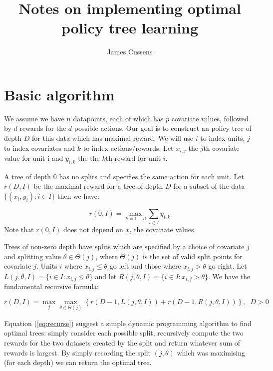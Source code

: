 \documentclass{article}
\title{Notes on implementing optimal policy tree learning}
\author{James Cussens}
\newcommand{\splitval}{\ensuremath{\theta}}
\newcommand{\splitvals}{\ensuremath{\Theta}}
\newcommand{\depth}{\ensuremath{D}}
\begin{document}
\maketitle

\section{Basic algorithm}
\label{sec:basics}



We assume we have $n$ datapoints, each of which has $p$ covariate
values, followed by $d$ rewards for the $d$ possible actions. Our goal
is to construct an policy tree of depth $\depth$ for this data which has
maximal reward. We will use $i$ to index units, $j$ to index
covariates and $k$ to index actions/rewards. Let $x_{i,j}$ the $j$th
covariate value for unit i and $y_{i,k}$ the the $k$th reward for unit $i$.

A tree of depth 0 has no splits and specifies the same action for each
unit. Let $r(\depth,I)$ be the maximal reward for a tree of depth
$\depth$ for a subset of the data $\{(x_{i},y_{i}): i \in I\}$ then we
have:

\begin{equation}
  \label{eq:rewardt0}
  r(0,I) = \max_{k=1,\dots d} \sum_{i \in I} y_{i,k}
\end{equation}
Note that $r(0,I)$ does not depend on $x$, the covariate values.

Trees of non-zero depth have splits which are specified by a choice of
covariate $j$ and splitting value $\splitval \in \splitvals(j)$, where
$\splitvals(j)$ is the set of valid split points for covariate
$j$. Units $i$ where $x_{i,j} \leq \splitval$ go left and those where
$x_{i,j} > \splitval$ go right. Let
$L(j,\splitval,I) = \{i \in I :x_{i,j} \leq \splitval\}$ and let
$R(j,\splitval,I) = \{i \in I :x_{i,j} > \splitval\}$. We have the
fundamental recursive formula:

\begin{equation}
  \label{eq:recurse}
  r(\depth,I) = \max_{j} \max_{\splitval \in \splitvals(j)} \left\{ r(\depth-1,L(j,\splitval,I))
  + r(\depth-1,R(j,\splitval,I))\right\}, \;\; \depth > 0 
\end{equation}

Equation (\ref{eq:recurse}) suggest a simple dynamic programming
algorithm to find optimal trees: simply consider each possible split,
recursively compute the two rewards for the two datasets created by the
split and return whatever sum of rewards is largest. By simply
recording the split $(j,\splitval)$ which was maximising (for each
depth) we can return the optimal tree.
\end{document}
